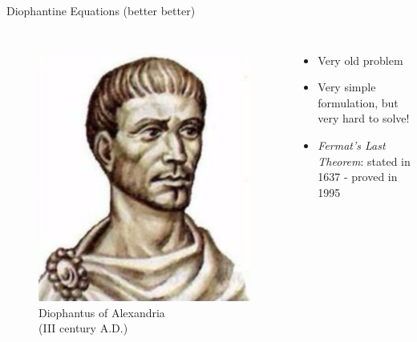 \documentclass[11pt]{beamer}
\begin{document}
\begin{frame}{Diophantine Equations (better better)}
  \begin{columns}
    \begin{figure}
      \begin{center}
        \includegraphics[scale=0.2]{img/diophantus.jpg}
        {\footnotesize Diophantus of Alexandria\\ (III century A.D.)}
      \end{center}
    \end{figure}
    \begin{itemize}
      \item<1-> Very old problem
      \item<2-> Very simple formulation, but very hard to solve!
      \item<3-> \emph{Fermat's Last Theorem}: stated in 1637 - proved in 1995
    \end{itemize}
  \end{columns}
\end{frame}
\end{document}
